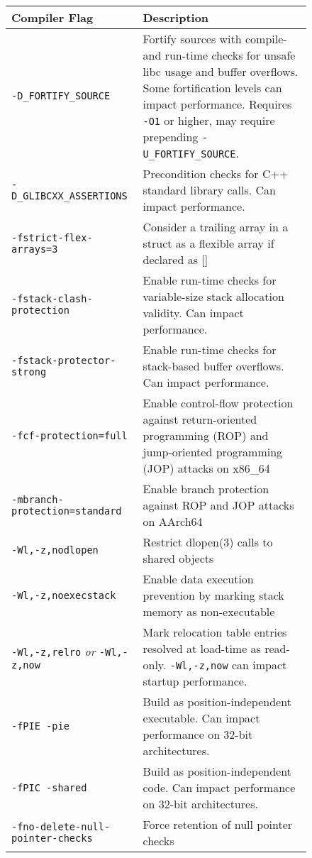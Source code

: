 \begin{figure}[ht]
    \centering
    
    \begin{longtable}[c]{p{} | p{}}
        \textbf{Compiler Flag} & \textbf{Description} \\
        \hline
        \texttt{-D\_FORTIFY\_SOURCE} & Fortify sources with compile- and run-time checks for unsafe libc usage and buffer overflows. Some fortification levels can impact performance. Requires \texttt{-O1} or higher, may require prepending \texttt{-U\_FORTIFY\_SOURCE}. \\
        \texttt{-D\_GLIBCXX\_ASSERTIONS}  & Precondition checks for C++ standard library calls. Can impact performance.\\
        \texttt{-fstrict-flex-arrays=3} & Consider a trailing array in a struct as a flexible array if declared as []\\
        \texttt{-fstack-clash-protection} & Enable run-time checks for variable-size stack allocation validity. Can impact performance.\\
        \texttt{-fstack-protector-strong} & Enable run-time checks for stack-based buffer overflows. Can impact performance.\\
        \texttt{-fcf-protection=full} & Enable control-flow protection against return-oriented programming (ROP) and jump-oriented programming (JOP) attacks on x86\_64\\
        \texttt{-mbranch-protection=standard} & Enable branch protection against ROP and JOP attacks on AArch64\\
        \texttt{-Wl,-z,nodlopen} & Restrict dlopen(3) calls to shared objects\\
        \texttt{-Wl,-z,noexecstack} & Enable data execution prevention by marking stack memory as non-executable\\
        \texttt{-Wl,-z,relro} \emph{or} \texttt{-Wl,-z,now} & Mark relocation table entries resolved at load-time as read-only. \texttt{-Wl,-z,now} can impact startup performance.\\
        \texttt{-fPIE -pie} & Build as position-independent executable. Can impact performance on 32-bit architectures.\\
        \texttt{-fPIC -shared} & Build as position-independent code. Can impact performance on 32-bit architectures.\\
        \texttt{-fno-delete-null-pointer-checks} & Force retention of null pointer checks\\

\end{longtable}
\end{figure}
